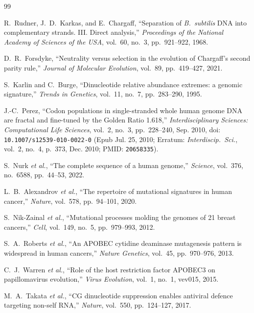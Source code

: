 \documentclass[11pt, a4paper]{article}
\DeclareRobustCommand{\_}{\textunderscore\allowbreak}
\begin{document}
\begin{thebibliography}{99}

R.~Rudner, J.~D.~Karkas, and E.~Chargaff,
``Separation of \textit{B.~subtilis} DNA into complementary strands. III. Direct analysis,''
\textit{Proceedings of the National Academy of Sciences of the USA}, vol.~60, no.~3, pp.~921--922, 1968.

D.~R.~Forsdyke,
``Neutrality versus selection in the evolution of Chargaff's second parity rule,''
\textit{Journal of Molecular Evolution}, vol.~89, pp.~419--427, 2021.

S.~Karlin and C.~Burge,
``Dinucleotide relative abundance extremes: a genomic signature,''
\textit{Trends in Genetics}, vol.~11, no.~7, pp.~283--290, 1995.

J.-C.~Perez,
``Codon populations in single-stranded whole human genome DNA are fractal and fine-tuned by the Golden Ratio 1.618,''
\textit{Interdisciplinary Sciences: Computational Life Sciences}, vol.~2, no.~3, pp.~228--240, Sep. 2010, doi: \texttt{10.1007/s12539-010-0022-0} (Epub Jul. 25, 2010; Erratum: \textit{Interdiscip.\ Sci.}, vol.~2, no.~4, p.~373, Dec. 2010; PMID: \texttt{20658335}).

S.~Nurk \textit{et al.},
``The complete sequence of a human genome,''
\textit{Science}, vol.~376, no.~6588, pp.~44--53, 2022.

L.~B.~Alexandrov \textit{et al.},
``The repertoire of mutational signatures in human cancer,''
\textit{Nature}, vol.~578, pp.~94--101, 2020.

S.~Nik-Zainal \textit{et al.},
``Mutational processes molding the genomes of 21 breast cancers,''
\textit{Cell}, vol.~149, no.~5, pp.~979--993, 2012.

S.~A.~Roberts \textit{et al.},
``An APOBEC cytidine deaminase mutagenesis pattern is widespread in human cancers,''
\textit{Nature Genetics}, vol.~45, pp.~970--976, 2013.

C.~J.~Warren \textit{et al.},
``Role of the host restriction factor APOBEC3 on papillomavirus evolution,''
\textit{Virus Evolution}, vol.~1, no.~1, vev015, 2015.

M.~A.~Takata \textit{et al.},
``CG dinucleotide suppression enables antiviral defence targeting non-self RNA,''
\textit{Nature}, vol.~550, pp.~124--127, 2017.


\end{thebibliography}
\end{document}
